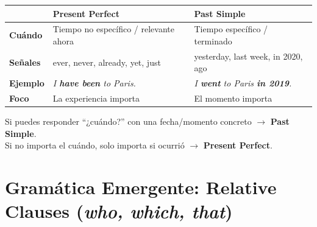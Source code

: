\documentclass[12pt,a4paper]{article}
\begin{document}
\begin{cajagrammar}
\begin{tabularx}{\textwidth}{@{} l X X @{}}
\toprule
& \textbf{Present Perfect} & \textbf{Past Simple} \\
\midrule
\textbf{Cuándo} & Tiempo no específico / relevante ahora & Tiempo específico / terminado \\
\textbf{Señales} & ever, never, already, yet, just & yesterday, last week, in 2020, ago \\
\textbf{Ejemplo} & \textit{I \textbf{have been} to Paris.} & \textit{I \textbf{went} to Paris \textbf{in 2019}.} \\
\textbf{Foco} & La experiencia importa & El momento importa \\
\bottomrule
\end{tabularx}

\medskip
\begin{cajaejemplo}
Si puedes responder ``¿cuándo?'' con una fecha/momento concreto $\rightarrow$ \textbf{Past Simple}.\\
Si no importa el cuándo, solo importa si ocurrió $\rightarrow$ \textbf{Present Perfect}.
\end{cajaejemplo}
\end{cajagrammar}

\section{Gramática Emergente: Relative Clauses (\textit{who, which, that})}
\end{document}
